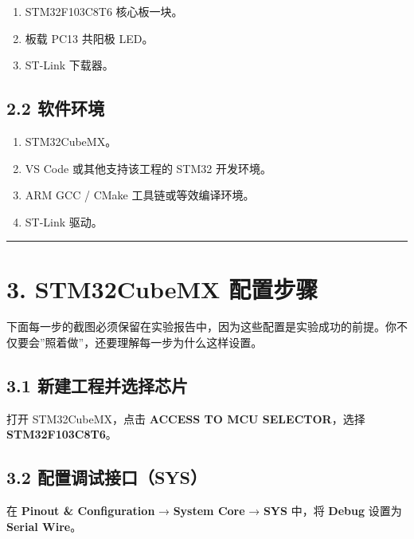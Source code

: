 \documentclass[
  chinese,
  UTF8,
  oneside,
  openany]{ctexbook}
\providecommand{\tightlist}{%
  \setlength{\itemsep}{0pt}\setlength{\parskip}{0pt}}
\begin{document}
\begin{enumerate}
\def\labelenumi{\arabic{enumi}.}
\tightlist
\item
  STM32F103C8T6 核心板一块。
\item
  板载 PC13 共阳极 LED。
\item
  ST-Link 下载器。
\end{enumerate}

\subsection{2.2 软件环境}\label{ux8f6fux4ef6ux73afux5883-3}

\begin{enumerate}
\def\labelenumi{\arabic{enumi}.}
\tightlist
\item
  STM32CubeMX。
\item
  VS Code 或其他支持该工程的 STM32 开发环境。
\item
  ARM GCC / CMake 工具链或等效编译环境。
\item
  ST-Link 驱动。
\end{enumerate}

\begin{center}\rule{0.5\linewidth}{0.5pt}\end{center}

\section{3. STM32CubeMX
配置步骤}\label{stm32cubemx-ux914dux7f6eux6b65ux9aa4-8}

下面每一步的截图必须保留在实验报告中，因为这些配置是实验成功的前提。你不仅要会''照着做''，还要理解每一步为什么这样设置。

\subsection{3.1
新建工程并选择芯片}\label{ux65b0ux5efaux5de5ux7a0bux5e76ux9009ux62e9ux82afux7247-2}

打开 STM32CubeMX，点击 \textbf{ACCESS TO MCU SELECTOR}，选择
\textbf{STM32F103C8T6}。

\subsection{3.2
配置调试接口（SYS）}\label{ux914dux7f6eux8c03ux8bd5ux63a5ux53e3sys-7}

在 \textbf{Pinout \& Configuration} → \textbf{System Core} →
\textbf{SYS} 中，将 \textbf{Debug} 设置为 \textbf{Serial Wire}。
\end{document}
